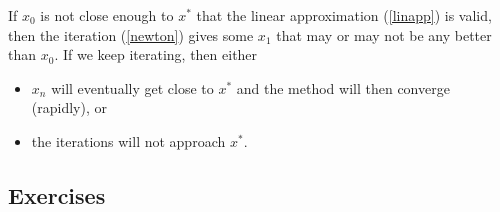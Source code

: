 If $x_0$ is not close enough to $x^*$ that the linear approximation
(\ref{linapp}) is valid, then the iteration (\ref{newton}) gives some
$x_1$ that may or may not be any better than $x_0$. If we keep iterating,
then either
\begin{itemize}
\item
$x_n$ will eventually get close to $x^*$ and the method will then
converge (rapidly), or
\item
the iterations will not approach $x^*$.
\end{itemize}
%


\newpage
\subsection*{Exercises}

